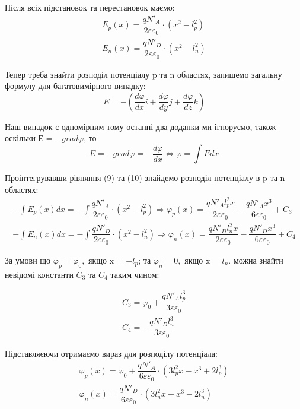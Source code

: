\documentclass[14pt,a4paper]{scrartcl}
\begin{document}
Після всіх підстановок та перестановок маємо:
\begin{align}
E_p(x) = \dfrac{qN'_A}{2\varepsilon\varepsilon_0} \cdot (x^2-l_p^2)\\
E_n(x) = \dfrac{qN'_D}{2\varepsilon\varepsilon_0}\cdot(x^2-l_n^2)
\end{align}

Тепер треба знайти розподіл потенціалу p та n областях, запишемо загальну формулу для багатовимірного випадку:
\begin{equation}
E=-\left(\dfrac{d\varphi}{dx}i+\dfrac{d\varphi}{dy}j+\dfrac{d\varphi}{dz}k \right)
\label{eq:ref}
\end{equation}

Наш випадок є одномірним тому останні два доданки ми ігноруємо, також оскільки  Е = $-grad\varphi$, то
\begin{equation}
E= -grad \varphi = -\dfrac{d\varphi}{dx} \Longleftrightarrow \varphi = \int E dx
\label{eq:ref}
\end{equation}

Проінтегрувавши рівняння (9) та (10) знайдемо розподіл потенціалу в p та n областях:
\begin{align}
-\int E_p (x)dx =-\int  \dfrac{qN'_A}{2\varepsilon\varepsilon_0} \cdot (x^2-l_p^2)\Rightarrow \varphi_p(x)=\dfrac{qN'_Al_p^2x}{2\varepsilon\varepsilon_0} -\dfrac{qN'_Ax^3}{6\varepsilon\varepsilon_0}+C_3\\
-\int E_n (x)dx =-\int  \dfrac{qN'_D}{2\varepsilon\varepsilon_0}\cdot(x^2-l_n^2)\Rightarrow \varphi_n(x)=\dfrac{qN'_Dl_n^2x}{2\varepsilon\varepsilon_0}-\dfrac{qN'_Dx^3}{6\varepsilon\varepsilon_0}+C_4
\end{align}

За умови що $\varphi_p=\varphi_0,  \text{ якщо x = $-l_p$;}$ та $\varphi_n=0,  \text{ якщо x = $l_n$.}$ можна знайти невідомі константи $C_3$ та $C_4$ таким чином:

\begin{align}
C_3=\varphi_0+ \dfrac{qN'_Al_p^3}{3\varepsilon\varepsilon_0}\\
C_4= -\dfrac{qN'_Dl_n^3}{3\varepsilon\varepsilon_0}
\end{align}

Підставляєючи отримаємо вираз для розподілу потенціала:
\begin{align}
\varphi_p(x)=\varphi_0+\dfrac{qN'_A}{6\varepsilon\varepsilon_0} \cdot (3l_p^2x-x^3+2l_p^3)\\
\varphi_n(x)= \dfrac{qN'_D}{6\varepsilon\varepsilon_0}\cdot (3l_n^2x-x^3-2l_n^3)
\end{align}
\end{document}
